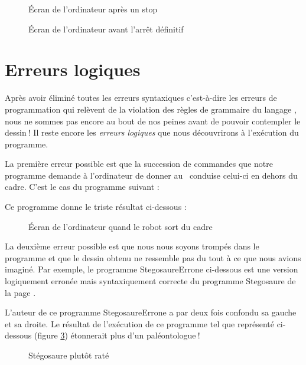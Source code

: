 \begin{figure}[p] %
 \caption{Écran de l'or\-di\-na\-teur après un stop}\label{fig:ecran-stop}
\end{figure}

\begin{figure}[p] %
 \caption{Écran de l'or\-di\-na\-teur avant l'arrêt définitif}
 \label{fig:ecran-arret}
\end{figure}

\clearpage
\section{Erreurs logiques} 

Après avoir éliminé toutes les erreurs syntaxiques c'est-à-dire 
les erreurs de programmation qui relèvent de la violation des règles de grammaire 
du langage \ocaml, nous ne sommes pas encore au bout de nos peines avant de pouvoir
contempler le \hbox{dessin$\:$!} Il reste encore les
{\em erreurs logiques}
que nous découvrirons à l'exécution du programme.

La première erreur possible est que la succession de commandes que notre
programme demande à l'or\-di\-na\-teur de donner au \robot\ conduise celui-ci
en dehors du cadre. C'est le cas du programme suivant :

\noindent Ce programme donne le triste résultat 
ci-dessous :
\begin{figure}[htbp]
 \caption{Écran de l'or\-di\-na\-teur quand le robot sort du cadre}
\end{figure}

La deuxième erreur possible est que nous nous soyons trompés dans
le programme et que le dessin obtenu ne ressemble pas du tout à ce
que nous avions imaginé. Par exemple, le programme {\idt StegosaureErrone}
ci-dessous est une version logiquement erronée mais syntaxiquement 
correcte du programme {\idt Stegosaure} de la page \pageref{prog:Stegosaure}. 

L'auteur de ce programme {\idt StegosaureErrone} a par deux fois confondu sa gauche 
et sa droite. Le 
résultat de l'exécution de ce programme tel
que représenté
ci-dessous
(figure \ref{fig:StegosaureErrone}) %
éton\-ne\-rait plus d'un pa\-lé\-on\-to\-lo\-gue$\:$!
\begin{figure}[htbp]
 \caption{Stégosaure plutôt raté}
 \label{fig:StegosaureErrone}
\end{figure}

